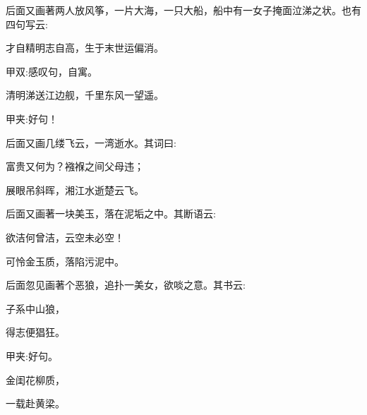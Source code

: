 \begin{parag}
    后面又画著两人放风筝，一片大海，一只大船，船中有一女子掩面泣涕之状。也有四句写云:
\end{parag}


\begin{poem}
    \begin{pl}才自精明志自高，生于末世运偏消。\end{pl}
    \begin{note}甲双:感叹句，自寓。\end{note}

    \begin{pl}清明涕送江边舰，千里东风一望遥。\end{pl}
    \begin{note}甲夹:好句！\end{note}
\end{poem}


\begin{parag}
    后面又画几缕飞云，一湾逝水。其词曰:
\end{parag}


\begin{poem}
    \begin{pl}富贵又何为？襁褓之间父母违；\end{pl}

    \begin{pl}展眼吊斜晖，湘江水逝楚云飞。\end{pl}

\end{poem}


\begin{parag}
    后面又画著一块美玉，落在泥垢之中。其断语云:
\end{parag}


\begin{poem}
    \begin{pl}欲洁何曾洁，云空未必空！\end{pl}

    \begin{pl}可怜金玉质，落陷污泥中。\end{pl}
\end{poem}


\begin{parag}
    后面忽见画著个恶狼，追扑一美女，欲啖之意。其书云:
\end{parag}


\begin{poem}
    \begin{pl}子系中山狼，\end{pl}

    \begin{pl}得志便猖狂。\end{pl}\begin{note}甲夹:好句。\end{note}

    \begin{pl}金闺花柳质，\end{pl}

    \begin{pl}一载赴黄梁。\end{pl}

\end{poem}



